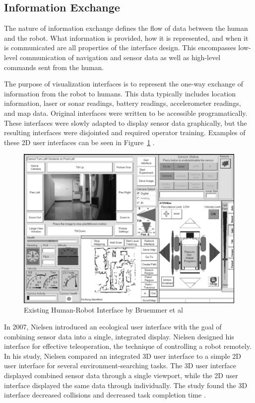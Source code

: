 \subsection{Information Exchange}
\label{sub:info_exchange}
The nature of information exchange defines the flow of data between the human and the robot. What information is provided, how it is represented, and when it is communicated are all properties of the interface design. This encompasses low-level communication of navigation and sensor data as well as high-level commands sent from the human. 

The purpose of visualization interfaces is to represent the one-way exchange of information from the robot to humans. This data typically includes location information, laser or sonar readings, battery readings, accelerometer readings, and map data. Original interfaces were written to be accessible programatically. These interfaces were slowly adapted to display sensor data graphically, but the resulting interfaces were disjointed and required operator training. Examples of these 2D user interfaces can be seen in Figure~\ref{fig:prior-hri} \cite{Bruemmer}.

\begin{figure}[ht]
\begin{center}
\includegraphics[width=5in]{images/prior-hri.png}
\caption{Existing Human-Robot Interface by Bruemmer et al
\label{fig:prior-hri}}
\end{center}
\end{figure}

In 2007, Nielsen introduced an ecological user interface with the goal of combining sensor data into a single, integrated display. Nielsen designed his interface for effective teleoperation, the technique of controlling a robot remotely. In his study, Nielsen compared an integrated 3D user interface to a simple 2D user interface for several environment-searching tasks. The 3D user interface displayed combined sensor data through a single viewport, while the 2D user interface displayed the same data through individually. The study found the 3D interface decreased collisions and decreased task completion time \cite{Nielsen_Teleoperation}.


